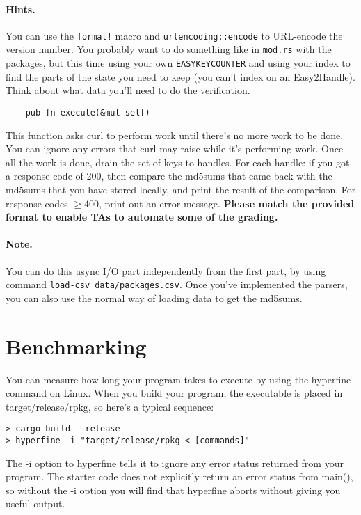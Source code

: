 \documentclass[12pt]{article}
\renewcommand{\_}{\kern-1.5pt\textunderscore\kern-1.5pt}
\begin{document}
\paragraph{Hints.} You can use the \texttt{format!} macro and \texttt{urlencoding::encode} to URL-encode the version number. You probably want to do something like in \texttt{mod.rs} with the packages, but this time using your own \texttt{EASYKEY\_COUNTER} and using your index to find the parts of the state you need to keep (you can't index on an Easy2Handle). Think about what data you'll need to do the verification.

\vspace{1em}
\begin{verbatim}
    pub fn execute(&mut self)
\end{verbatim}
This function asks curl to perform work until there's no more work to be done. You can ignore any errors that curl may raise while it's performing work. Once all the work is done, drain the set of keys to handles. For each handle: if you got a response code of 200, then compare the md5sums that came back with the md5sums that you have stored locally, and print the result of the comparison. For response codes $\ge 400$, print out an error message. {\bf Please match the provided format to enable TAs to automate some of the grading.}

\paragraph{Note.} You can do this async I/O part independently from the first part, by using command
\texttt{load-csv data/packages.csv}. Once you've implemented the parsers, you can also
use the normal way of loading data to get the md5sums.

\section*{Benchmarking}

You can measure how long your program takes to execute by using the hyperfine command on Linux. When you build your program, the executable is placed in target/release/rpkg, so here's a typical sequence:\par

\begin{verbatim}
> cargo build --release
> hyperfine -i "target/release/rpkg < [commands]"
\end{verbatim}

\vspace{1em}
The -i option to hyperfine tells it to ignore any error status returned from your program. The starter code does not explicitly return an error status from main(), so without the -i option you will find that hyperfine aborts without giving you useful output.\par
\end{document}
